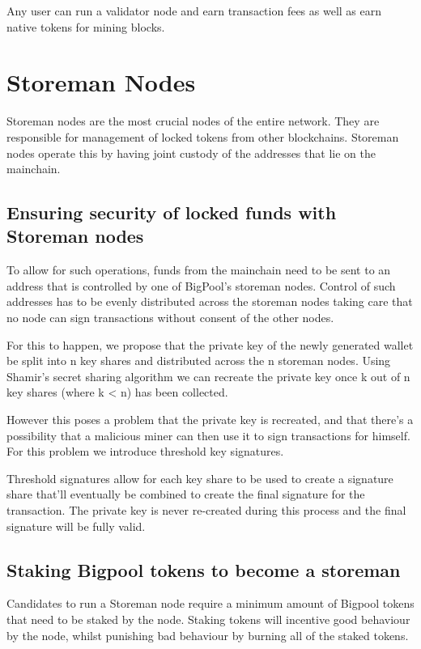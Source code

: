 \documentclass{Bigpool}
\begin{document}
Any user can run a validator node and earn transaction fees as well as earn native tokens for mining blocks. 

\section{Storeman Nodes}
Storeman nodes are the most crucial nodes of the entire network. They are responsible for management of locked tokens from other blockchains. Storeman nodes operate this by having joint custody of the addresses that lie on the mainchain. 

\subsection{Ensuring security of locked funds with Storeman nodes}
To allow for such operations, funds from the mainchain need to be sent to an address that is controlled by one of BigPool’s storeman nodes. Control of such addresses has to be evenly distributed across the storeman nodes taking care that no node can sign transactions without consent of the other nodes.

For this to happen, we propose that the private key of the newly generated wallet be split into n key shares and distributed across the n storeman nodes. Using Shamir’s secret sharing algorithm we can recreate the private key once k out of n key shares (where k < n) has been collected.

However this poses a problem that the private key is recreated, and that there’s a possibility that a malicious miner can then use it to sign transactions for himself. For this problem we introduce threshold key signatures.

Threshold signatures allow for each key share to be used to create a signature share that’ll eventually be combined to create the final signature for the transaction. The private key is never re-created during this process and the final signature will be fully valid. 



\subsection{Staking Bigpool tokens to become a storeman}
Candidates to run a Storeman node require a minimum amount of Bigpool tokens that need to be staked by the node. Staking tokens will incentive good behaviour by the node, whilst punishing bad behaviour by burning all of the staked tokens.
\end{document}

